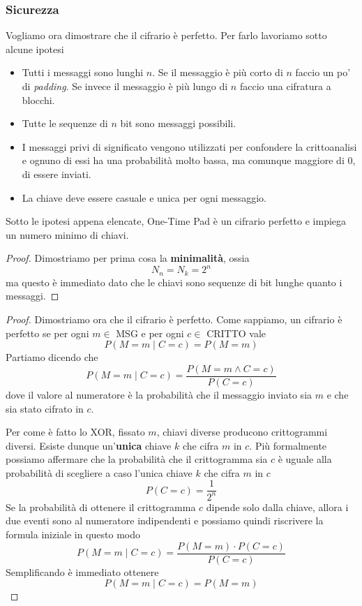 \subsubsection{Sicurezza}
Vogliamo ora dimostrare che il cifrario \`e perfetto. Per farlo lavoriamo sotto alcune ipotesi
\begin{itemize}
	\item Tutti i messaggi sono lunghi $n$. Se il messaggio \`e pi\`u corto di $n$ faccio un po' di \emph{padding}.
	      Se invece il messaggio \`e pi\`u lungo di $n$ faccio una cifratura a blocchi.
	\item Tutte le sequenze di $n$ bit sono messaggi possibili.
	\item I messaggi privi di significato vengono utilizzati per confondere la crittoanalisi e ognuno di essi ha una
	      probabilit\`a molto bassa, ma comunque maggiore di 0, di essere inviati.
	\item La chiave deve essere casuale e unica per ogni messaggio.
\end{itemize}

\begin{theorem}
	Sotto le ipotesi appena elencate, One-Time Pad \`e un cifrario perfetto e impiega un numero minimo di chiavi.
	\begin{proof}
		Dimostriamo per prima cosa la \textbf{minimalit\`a}, ossia
		\[ N_n = N_k = 2^n \]
		ma questo \`e immediato dato che le chiavi sono sequenze di bit lunghe quanto i messaggi.
	\end{proof}

	\begin{proof}
		Dimostriamo ora che il cifrario \`e perfetto. Come sappiamo, un cifrario \`e perfetto se per ogni $m \in$ MSG e
		per ogni $c \in$ CRITTO vale
		\[ P(M = m \mid C = c) = P(M = m) \]
		Partiamo dicendo che
		\[ P(M = m \mid C = c) = \frac{P(M = m \wedge C = c)}{P(C = c)} \]
		dove il valore al numeratore \`e la probabilit\`a che il messaggio inviato sia $m$ e che sia stato cifrato in $c$.

		Per come \`e fatto lo XOR, fissato $m$, chiavi diverse producono crittogrammi diversi. Esiste dunque
		un'\textbf{unica} chiave $k$ che cifra $m$ in $c$. Pi\`u formalmente possiamo affermare che la probabilit\`a che
		il crittogramma sia $c$ \`e uguale alla probabilit\`a di scegliere a caso l'unica chiave $k$ che cifra $m$ in $c$
		\[ P(C = c) = \frac{1}{2^n} \]
		Se la probabilit\`a di ottenere il crittogramma $c$ dipende solo dalla chiave, allora i due eventi sono al
		numeratore indipendenti e possiamo quindi riscrivere la formula iniziale in questo modo
		\[ P(M = m \mid C = c) = \frac{P(M = m) \cdot P(C = c)}{P(C = c)} \]
		Semplificando \`e immediato ottenere
		\[ P(M = m \mid C = c) = P(M = m) \]
	\end{proof}
\end{theorem}

